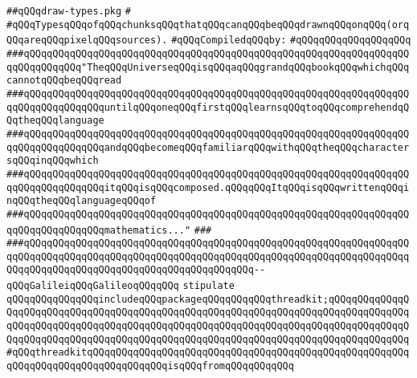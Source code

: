 \label{src/lib/x-kit/xclient/src/window/draw-types.pkg}
\verb|##qQQqdraw-types.pkg|\newline
\verb|#|\newline
\verb|#qQQqTypesqQQqofqQQqchunksqQQqthatqQQqcanqQQqbeqQQqdrawnqQQqonqQQq(orqQQqareqQQqpixelqQQqsources).|\newline
\newline
\verb|#qQQqCompiledqQQqby:|\newline
\verb|#qQQqqQQqqQQqqQQqqQQq|\newline
\newline
\newline
\newline
\newline
\newline
\newline
\verb|###qQQqqQQqqQQqqQQqqQQqqQQqqQQqqQQqqQQqqQQqqQQqqQQqqQQqqQQqqQQqqQQqqQQqqQQqqQQqqQQq"TheqQQqUniverseqQQqisqQQqaqQQqgrandqQQqbookqQQqwhichqQQqcannotqQQqbeqQQqread|\newline
\verb|###qQQqqQQqqQQqqQQqqQQqqQQqqQQqqQQqqQQqqQQqqQQqqQQqqQQqqQQqqQQqqQQqqQQqqQQqqQQqqQQqqQQquntilqQQqoneqQQqfirstqQQqlearnsqQQqtoqQQqcomprehendqQQqtheqQQqlanguage|\newline
\verb|###qQQqqQQqqQQqqQQqqQQqqQQqqQQqqQQqqQQqqQQqqQQqqQQqqQQqqQQqqQQqqQQqqQQqqQQqqQQqqQQqqQQqandqQQqbecomeqQQqfamiliarqQQqwithqQQqtheqQQqcharactersqQQqinqQQqwhich|\newline
\verb|###qQQqqQQqqQQqqQQqqQQqqQQqqQQqqQQqqQQqqQQqqQQqqQQqqQQqqQQqqQQqqQQqqQQqqQQqqQQqqQQqqQQqitqQQqisqQQqcomposed.qQQqqQQqItqQQqisqQQqwrittenqQQqinqQQqtheqQQqlanguageqQQqof|\newline
\verb|###qQQqqQQqqQQqqQQqqQQqqQQqqQQqqQQqqQQqqQQqqQQqqQQqqQQqqQQqqQQqqQQqqQQqqQQqqQQqqQQqqQQqmathematics..."|\newline
\verb|###|\newline
\verb|###qQQqqQQqqQQqqQQqqQQqqQQqqQQqqQQqqQQqqQQqqQQqqQQqqQQqqQQqqQQqqQQqqQQqqQQqqQQqqQQqqQQqqQQqqQQqqQQqqQQqqQQqqQQqqQQqqQQqqQQqqQQqqQQqqQQqqQQqqQQqqQQqqQQqqQQqqQQqqQQqqQQqqQQqqQQqqQQqqQQq--qQQqGalileiqQQqGalileoqQQqqQQq|\newline
\newline
\newline
\newline
\verb|stipulate|\newline
\verb|qQQqqQQqqQQqqQQqincludeqQQqpackageqQQqqQQqqQQqthreadkit;qQQqqQQqqQQqqQQqqQQqqQQqqQQqqQQqqQQqqQQqqQQqqQQqqQQqqQQqqQQqqQQqqQQqqQQqqQQqqQQqqQQqqQQqqQQqqQQqqQQqqQQqqQQqqQQqqQQqqQQqqQQqqQQqqQQqqQQqqQQqqQQqqQQqqQQqqQQqqQQqqQQqqQQqqQQqqQQqqQQqqQQqqQQqqQQqqQQqqQQqqQQqqQQqqQQqqQQqqQQqqQQq#qQQqthreadkitqQQqqQQqqQQqqQQqqQQqqQQqqQQqqQQqqQQqqQQqqQQqqQQqqQQqqQQqqQQqqQQqqQQqqQQqqQQqqQQqqQQqisqQQqfromqQQqqQQqqQQq|\newline
